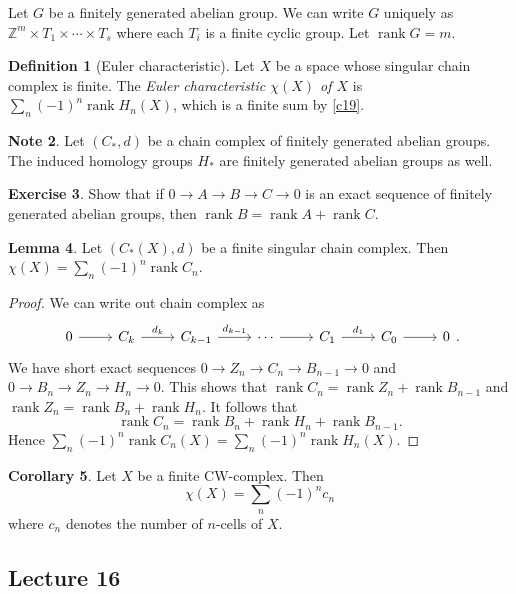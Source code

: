 \documentclass[10pt,letterpaper,cm]{nupset}
\theoremstyle{definition}
\newtheorem{definition}{Definition}[subsection]
\newtheorem{note}[definition]{Note}
\theoremstyle{theorem}
\newtheorem{lemma}[definition]{Lemma}
\newtheorem{corollary}[definition]{Corollary}
\newtheorem{exercise}[definition]{Exercise}
\theoremstyle{remark}
\newcommand{\Z}{\mathbb Z}
\newcommand{\1}{\mathbb{1}}
\newcommand{\0}{\vec 0}
\DeclareMathOperator{\rnk}{rank}
\begin{document}
\smallskip

Let $G$ be a finitely generated abelian group. We can write $G$ uniquely as  $\Z^m \times T_1 \times \cdots \times T_s$ where each $T_i$ is a  finite cyclic group. Let $\rnk{G} = m$.

\begin{definition}[Euler characteristic]
 Let $X$ be a space whose singular chain complex is finite. The \textit{Euler characteristic $\chi(X)$ of $X$} is $ \sum_n({-1})^n\rnk{H_n(X)}$, which is a finite sum by \cref{c19}.
\end{definition}

\begin{note}
Let $\left(C_{\ast}, d\right)$ be a chain complex of finitely generated abelian groups. The induced homology groups $H_{\ast}$ are finitely generated abelian groups as well. 
\end{note}

\begin{exercise}
Show that if $0 \to A \to B \to C \to 0$ is an exact sequence of finitely generated abelian groups, then $\rnk{B}= \rnk{A} + \rnk{C}$.
\end{exercise}

\begin{lemma}
Let $\left(C_{\ast}(X), d\right)$ be a finite singular chain complex. Then $\chi(X) =\sum_n ({-1})^n\rnk{C_n}$.
\end{lemma}
\begin{proof}
We can write out chain complex as
\[\begin{tikzcd}
0 \arrow[r] & C_k \arrow[r, "d_k"] & C_{k-1} \arrow[r, "d_{k-1}"] & \cdots \arrow[r] & C_1 \arrow[r, "d_1"] & C_0 \arrow[r] & 0
\end{tikzcd}
.\] We have short exact sequences $0 \to Z_n \to C_n \to B_{n-1} \to 0$ and $0 \to B_n \to Z_n \to H_n \to 0$. This shows that $\rnk{C_n}= \rnk{Z_n} +\rnk{B_{n-1}}$ and $\rnk{Z_n} = \rnk{B_n} + \rnk{H_n}$. It follows that $$\rnk{C_n}=  \rnk{B_n} + \rnk{H_n}  +\rnk{B_{n-1}}  .  $$ Hence $ \sum_n({-1})^n\rnk{C_n(X)} =  \sum_n({-1})^n\rnk{H_n(X)}$.
\end{proof}

\begin{corollary}
 Let $X$ be a finite CW-complex. Then $$\chi(X) = \sum_{n} ({-1})^nc_n$$ where $c_n$ denotes the number of $n$-cells of $X$.
\end{corollary}

\subsection{Lecture 16}
\end{document}
